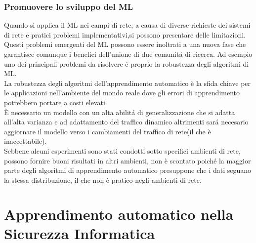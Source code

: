 \documentclass[../tesi.tex]{subfiles}
\begin{document}
\subsubsection{Promuovere lo sviluppo del ML}

Quando si applica il ML nei campi di rete, a causa di diverse richieste dei sistemi di rete e pratici problemi implementativi,si possono presentare delle limitazioni.\\
Questi problemi emergenti del ML possono essere inoltrati a una nuova fase che garantisce comunque i benefici dell’unione di due comunitá di ricerca.
Ad esempio uno dei principali problemi da risolvere é proprio la robustezza degli algoritmi di ML.\\ 
La robustezza degli algoritmi dell’apprendimento automatico è la sfida chiave per le applicazioni nell’ambiente del mondo reale dove gli errori di apprendimento potrebbero portare a costi elevati.\\
È necessario un modello con un alta abilitá di generalizzazione che si adatta all’alta varianza e ad adattamento del traffico dinamico altrimenti sará necesario aggiornare il modello verso i cambiamenti del traffico di rete(il che è inaccettabile).\\
Sebbene alcuni esperimenti sono stati condotti sotto specifici ambienti di rete, possono fornire buoni risultati in altri ambienti, non è scontato poiché la maggior parte degli algoritmi di apprendimento automatico presuppone che i dati seguano la stessa distribuzione, il che non è pratico negli ambienti di rete.
\cite{wang2017machine,ridwan2021applications,boutaba2018comprehensive}
\newpage
\section{Apprendimento automatico nella Sicurezza Informatica}
\end{document}
